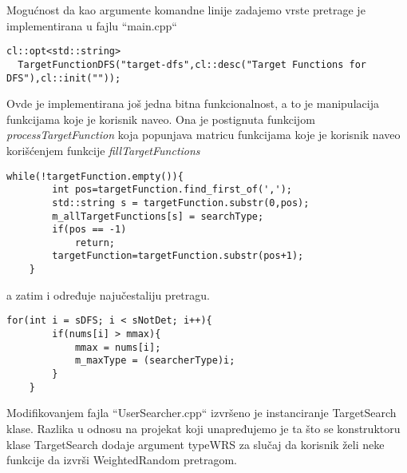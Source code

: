 \documentclass[a4paper]{article}
\begin{document}
Mogućnost da kao argumente komandne linije zadajemo vrste pretrage je implementirana u fajlu ``main.cpp`` 
\begin{lstlisting}[title={Definisanje imena pretrage za komandnu liniju}]
cl::opt<std::string>
  TargetFunctionDFS("target-dfs",cl::desc("Target Functions for DFS"),cl::init(""));
\end{lstlisting}
Ovde je implementirana još jedna bitna funkcionalnost, a to je manipulacija funkcijama koje je korisnik naveo. Ona je postignuta funkcijom \textit{processTargetFunction} koja popunjava matricu funkcijama koje je korisnik naveo korišćenjem funkcije \textit{fillTargetFunctions}
\begin{lstlisting}[title={Popunjavanje matrice}]
    while(!targetFunction.empty()){
        int pos=targetFunction.find_first_of(',');
        std::string s = targetFunction.substr(0,pos);
        m_allTargetFunctions[s] = searchType;
        if(pos == -1)
            return;
        targetFunction=targetFunction.substr(pos+1);
    }
\end{lstlisting}

a zatim i određuje najučestaliju pretragu. 
\begin{lstlisting}[title={Određivanje najučestalije pretrage}]
    for(int i = sDFS; i < sNotDet; i++){
        if(nums[i] > mmax){
            mmax = nums[i];
            m_maxType = (searcherType)i;
        }
    }
\end{lstlisting}

Modifikovanjem fajla ``UserSearcher.cpp`` izvršeno je instanciranje TargetSearch klase. Razlika u odnosu na projekat koji unapređujemo je ta što se konstruktoru klase TargetSearch dodaje argument typeWRS za slučaj da korisnik želi neke funkcije da izvrši WeightedRandom pretragom.
\end{document}
